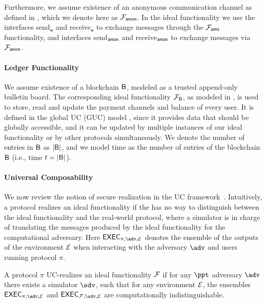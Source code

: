 Furthermore, we assume existence of an anonymous communication channel as defined in 
\cite{cl}, which we denote here as $\mathcal{F}_{\mathsf{anon}}$. In the ideal functionality we use the 
interfaces send$_\smt$ and receive$_\smt$ to exchange messages through the $\mathcal{F}_{\mathsf{smt}}$ 
functionality, and interfaces send$_{\mathsf{anon}}$ and receive$_{\mathsf{anon}}$ to exchange messages via 
$\mathcal{F}_{\mathsf{anon}}$.

\paragraph{Ledger Functionality}
We assume existence of a blockchain $\mathsf{B}$, modeled as a trusted append-only bulletin board. 
The corresponding ideal functionality $\mathcal{F}_{\mathsf{B}}$, as modeled in \cite{perun}, is used to 
store, read and update the payment channels and balance of every user. It is defined in the 
global UC (GUC) model \cite{guc}, since it provides data that should be globally accessible, 
and it can be updated by multiple instances of our ideal functionality or by other protocols 
simultaneously. We denote the number of entries in $\mathsf{B}$ as $|\mathsf{B}|$, and we model time as the 
number of entries of the blockchain $\mathsf{B}$ (i.e., time $t = |\mathsf{B}|$).


\paragraph{Universal Composability}
We now review the notion of secure realization in the UC framework~\cite{canetti}. 
Intuitively, a protocol realizes an ideal functionality if the  has no way 
to distinguish between the ideal functionality and the real-world protocol, where 
a simulator is in charge of translating the messages produced by the ideal functionality 
for the computational adversary. Here $\exec_{\pi, \adv, \dist}$ denotes the ensemble of 
the outputs of the environment $\mathcal{E}$ when interacting with the adversary $\adv$ and 
users running protocol $\pi$.

\begin{definition}
A protocol $\pi$ UC-realizes an ideal functionality $\mathcal{F}$ if for any $\ppt$ adversary 
$\adv$ there exists a simulator $\sdv$, such that for any environment $\mathcal{E}$, the 
ensembles $\exec_{\pi, \adv, \dist}$ and $\exec_{\FF, \sdv, \dist}$ are computationally 
indistinguishable.
\end{definition}

